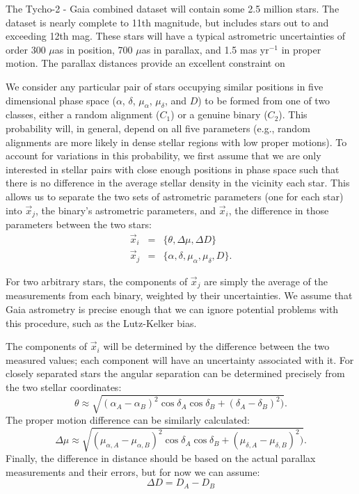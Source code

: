 \documentclass[12pt, preprint]{aastex}
\begin{document}
The Tycho-2 - Gaia combined dataset will contain some 2.5 million stars. The dataset is nearly complete to 11th magnitude, but includes stars out to and exceeding 12th mag. These stars will have a typical astrometric uncertainties of order 300 $\mu$as in position, 700 $\mu$as in parallax, and 1.5 mas yr$^{-1}$ in proper motion. The parallax distances provide an excellent constraint on 



We consider any particular pair of stars occupying similar positions in five dimensional phase space ($\alpha$, $\delta$, $\mu_{\alpha}$, $\mu_{\delta}$, and $D$) to be formed from one of two classes, either a random alignment ($C_1$) or a genuine binary ($C_2$). This probability will, in general, depend on all five parameters (e.g., random alignments are more likely in dense stellar regions with low proper motions). To account for variations in this probability, we first assume that we are only interested in stellar pairs with close enough positions in phase space such that there is no difference in the average stellar density in the vicinity each star. This allows us to separate the two sets of astrometric parameters (one for each star) into $\vec{x}_j$, the binary's astrometric parameters, and $\vec{x}_i$, the difference in those parameters between the two stars:
\begin{eqnarray}
\vec{x}_i &=& \{\theta, \Delta \mu, \Delta D\} \\
\vec{x}_j &=& \{ \alpha, \delta, \mu_{\alpha}, \mu_{\delta}, D \}.
\end{eqnarray}

For two arbitrary stars, the components of $\vec{x}_j$ are simply the average of the measurements from each binary, weighted by their uncertainties. We assume that Gaia astrometry is precise enough that we can ignore potential problems with this procedure, such as the Lutz-Kelker bias.


The components of $\vec{x}_i$ will be determined by the difference between the two measured values; each component will have an uncertainty associated with it. For closely separated stars the angular separation can be determined precisely from the two stellar coordinates:
\begin{equation}
\theta \approx \sqrt{(\alpha_A - \alpha_B)^2 \cos \delta_A \cos \delta_B
			 + (\delta_A - \delta_B)^2)}.
\end{equation}
The proper motion difference can be similarly calculated:
\begin{equation}
\Delta \mu \approx \sqrt{(\mu_{\alpha, A} - \mu_{\alpha, B})^2 
			\cos \delta_A \cos \delta_B 
			+ (\mu_{\delta, A} - \mu_{\delta, B})^2)}.
\end{equation}
Finally, the difference in distance should be based on the actual parallax measurements and their errors, but for now we can assume:
\begin{equation}
\Delta D = D_A - D_B
\end{equation}
\end{document}
